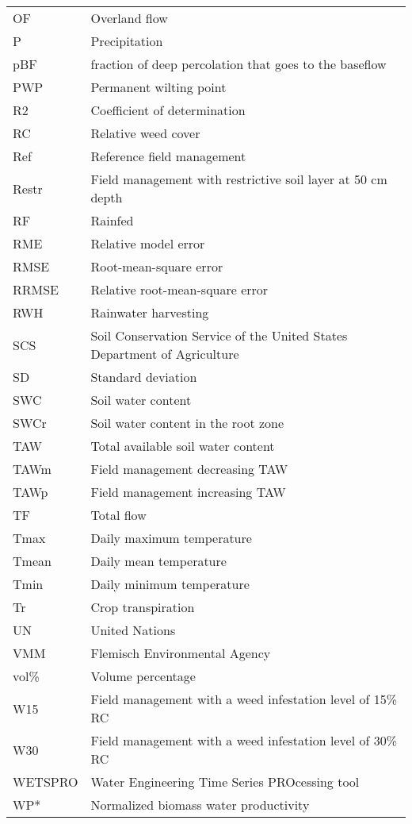\begin{tabularx}{\textwidth}{lX}
OF    & Overland flow \\
P     & Precipitation \\
pBF   & fraction of deep percolation that goes to the baseflow \\
PWP   & Permanent wilting point \\
R2    & Coefficient of determination \\
RC    & Relative weed cover \\
Ref   & Reference field management \\
Restr & Field management with restrictive soil layer at 50 cm depth \\
RF    & Rainfed \\
RME   & Relative model error \\
RMSE  & Root-mean-square error \\
RRMSE & Relative root-mean-square error \\
RWH   & Rainwater harvesting  \\
SCS   & Soil Conservation Service of the United States Department of Agriculture \\
SD    & Standard deviation \\
SWC   & Soil water content \\
SWCr  & Soil water content in the root zone \\
TAW   & Total available soil water content  \\
TAWm  & Field management decreasing TAW  \\
TAWp  & Field management increasing TAW  \\
TF    & Total flow \\
Tmax  & Daily maximum temperature \\
Tmean & Daily mean temperature  \\
Tmin  & Daily minimum temperature \\
Tr    & Crop transpiration \\
UN    & United Nations \\
VMM   & Flemisch Environmental Agency \\
vol\% & Volume percentage \\
W15   & Field management with a weed infestation level of 15\% RC \\
W30   & Field management with a weed infestation level of 30\% RC \\
WETSPRO & Water Engineering Time Series PROcessing tool \\
WP*   & Normalized biomass water productivity \\

\end{tabularx}
